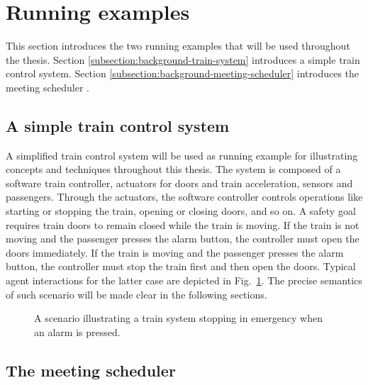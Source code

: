 \section{Running examples\label{section:background-running-examples}}

This section introduces the two running examples that will be used throughout the thesis. Section \ref{subsection:background-train-system} introduces a simple train control system. Section \ref{subsection:background-meeting-scheduler} introduces the meeting scheduler \cite{Feather:1997}.

\subsection{A simple train control system\label{subsection:background-train-system}}

A simplified train control system will be used as running example for illustrating concepts and techniques throughout this thesis. The system is composed of a software train controller, actuators for doors and train acceleration, sensors and passengers. Through the actuators, the software controller controls operations like starting or stopping the train, opening or closing doors, and so on. A safety goal requires train doors to remain closed while the train is moving. If the train is not moving and the passenger presses the alarm button, the controller must open the doors immediately. If the train is moving and the passenger presses the alarm button, the controller must stop the train first and then open the doors. Typical agent interactions for the latter case are depicted in Fig.~\ref{image:train-scenario-all-agents}. The precise semantics of such scenario will be made clear in the following sections.

\begin{figure}\centering
{}
\caption{A scenario illustrating a train system stopping in emergency when an alarm is pressed.\label{image:train-scenario-all-agents}}
\end{figure}

\subsection{The meeting scheduler\label{subsection:background-meeting-scheduler}}
